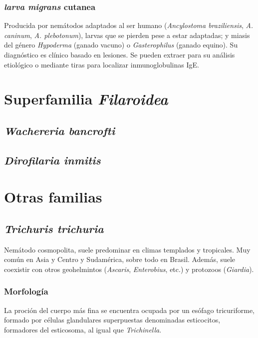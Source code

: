 \subsubsection{\textit{larva migrans} cutanea}
Producida por nemátodos adaptados al ser humano (\textit{Ancylostoma braziliensis}, \textit{A. caninum}, \textit{A. plebotonum}), larvas que se pierden pese a estar adaptadas; y miasis del género \textit{Hypoderma} (ganado vacuno) o \textit{Gasterophilus} (ganado equino). Su diagnóstico es clínico basado en lesiones. Se pueden extraer para su análisis etiológico o mediante tiras para localizar inmunoglobulinas IgE. 
\newpage
\section{Superfamilia \textit{Filaroidea}}
\subsection{\textit{Wachereria bancrofti}}
\subsection{\textit{Dirofilaria inmitis}}
\newpage
\section{Otras familias}
\subsection{\textit{Trichuris trichuria}}
Nemátodo cosmopolita, suele predominar en climas templados y tropicales. Muy común en Asia y Centro y Sudamérica, sobre todo en Brasil. Además, suele coexistir con otros geohelmintos (\textit{Ascaris}, \textit{Enterobius}, etc.) y protozoos (\textit{Giardia}).
\subsubsection{Morfología}
La proción del cuerpo más fina se encuentra ocupada por un esófago tricuriforme, formado por células glandulares superpuestas denominadas esticocitos, formadores del esticosoma, al igual que \textit{Trichinella}.

